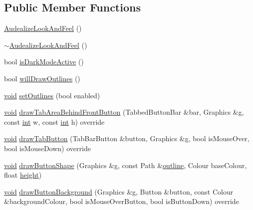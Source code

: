 \subsection*{Public Member Functions}
\begin{DoxyCompactItemize}
\item 
\hyperlink{class_audealize_1_1_audealize_look_and_feel_a157d9f7894bfa68344eacffcf1ad5a3b}{Audealize\+Look\+And\+Feel} ()
\item 
\hyperlink{class_audealize_1_1_audealize_look_and_feel_ac7df5803f0b99f7a1457a51083b3ab4b}{$\sim$\+Audealize\+Look\+And\+Feel} ()
\item 
bool \hyperlink{class_audealize_1_1_audealize_look_and_feel_a01c479960bad8e8d1c323638c6079a53}{is\+Dark\+Mode\+Active} ()
\item 
bool \hyperlink{class_audealize_1_1_audealize_look_and_feel_a342e31b1c34e5589a07481020ee36d20}{will\+Draw\+Outlines} ()
\item 
\hyperlink{tk_8h_aba408b7cd755a96426e004c015f5de8e}{void} \hyperlink{class_audealize_1_1_audealize_look_and_feel_a4a2eef3d96e63217bf12107ed0a886fe}{set\+Outlines} (bool enabled)
\item 
\hyperlink{tk_8h_aba408b7cd755a96426e004c015f5de8e}{void} \hyperlink{class_audealize_1_1_audealize_look_and_feel_a33f411b9ad518d118382fff627b6fd32}{draw\+Tab\+Area\+Behind\+Front\+Button} (Tabbed\+Button\+Bar \&bar, Graphics \&g, const \hyperlink{tk_8h_a83f82f76e7fed06f4c49d2db94028a6d}{int} w, const \hyperlink{tk_8h_a83f82f76e7fed06f4c49d2db94028a6d}{int} h) override
\item 
\hyperlink{tk_8h_aba408b7cd755a96426e004c015f5de8e}{void} \hyperlink{class_audealize_1_1_audealize_look_and_feel_aac0146d30456eae67536f716bb7d9776}{draw\+Tab\+Button} (Tab\+Bar\+Button \&button, Graphics \&g, bool is\+Mouse\+Over, bool is\+Mouse\+Down) override
\item 
\hyperlink{tk_8h_aba408b7cd755a96426e004c015f5de8e}{void} \hyperlink{class_audealize_1_1_audealize_look_and_feel_a152c1f980c72b1287ba02dc1b2dd2b24}{draw\+Button\+Shape} (Graphics \&g, const Path \&\hyperlink{class_audealize_1_1_audealize_look_and_feel_a58cf84e200bd9f7b6f8677c82245d9b9}{outline}, Colour base\+Colour, float \hyperlink{tk_8h_a67be2f4b9d9c5b3559139bfb072e2e81}{height})
\item 
\hyperlink{tk_8h_aba408b7cd755a96426e004c015f5de8e}{void} \hyperlink{class_audealize_1_1_audealize_look_and_feel_a935f07ee09a1c4e1252515d789aebde7}{draw\+Button\+Background} (Graphics \&g, Button \&button, const Colour \&background\+Colour, bool is\+Mouse\+Over\+Button, bool is\+Button\+Down) override

\end{DoxyCompactItemize}
